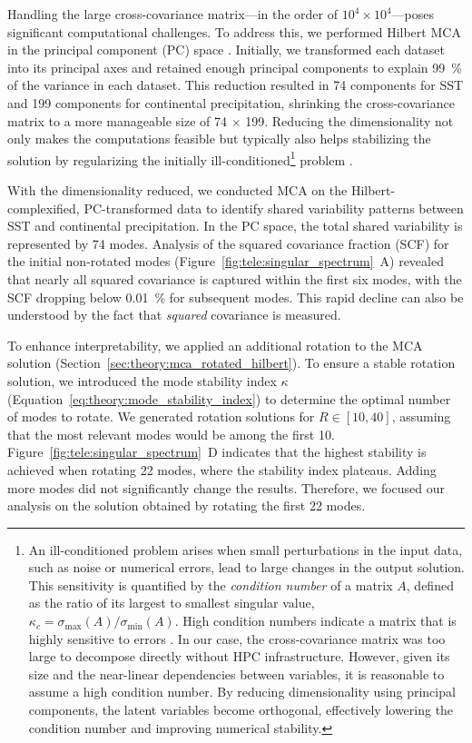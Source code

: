 Handling the large cross-covariance matrix---in the order of $10^4 \times 10^4$---poses significant computational challenges. To address this, we performed Hilbert MCA in the principal component (PC) space \cite{barnett_origins_1987}. Initially, we transformed each dataset into its principal axes and retained enough principal components to explain \qty{99}{\percent} of the variance in each dataset. This reduction resulted in 74 components for SST and 199 components for continental precipitation, shrinking the cross-covariance matrix to a more manageable size of 74 $\times$ 199. Reducing the dimensionality not only makes the computations feasible but typically also helps stabilizing the solution by regularizing the initially ill-conditioned\footnote{An ill-conditioned problem arises when small perturbations in the input data, such as noise or numerical errors, lead to large changes in the output solution. This sensitivity is quantified by the \textit{condition number} of a matrix $A$, defined as the ratio of its largest to smallest singular value, $\kappa_c = \sigma_{\text{max}}(A) / \sigma_{\text{min}}(A)$. High condition numbers indicate a matrix that is highly sensitive to errors \cite[e.g.][Section 2.6]{golub_matrix_2013}. In our case, the cross-covariance matrix was too large to decompose directly without HPC infrastructure. However, given its size and the near-linear dependencies between variables, it is reasonable to assume a high condition number. By reducing dimensionality using principal components, the latent variables become orthogonal, effectively lowering the condition number and improving numerical stability.} problem \cite{barnett_origins_1987}.

With the dimensionality reduced, we conducted MCA on the Hilbert-complexified, PC-transformed data to identify shared variability patterns between SST and continental precipitation. In the PC space, the total shared variability is represented by 74 modes. Analysis of the squared covariance fraction (SCF) for the initial non-rotated modes (Figure~\ref{fig:tele:singular_spectrum}~A) revealed that nearly all squared covariance is captured within the first six modes, with the SCF dropping below \qty{0.01}{\percent} for subsequent modes. This rapid decline can also be understood by the fact that \emph{squared} covariance is measured. 

To enhance interpretability, we applied an additional rotation to the MCA solution (Section~\ref{sec:theory:mca_rotated_hilbert}). To ensure a stable rotation solution, we introduced the mode stability index $\kappa$ (Equation~\eqref{eq:theory:mode_stability_index}) to determine the optimal number of modes to rotate. We generated rotation solutions for $R\in[10, 40]$, assuming that the most relevant modes would be among the first 10. Figure~\ref{fig:tele:singular_spectrum}~D indicates that the highest stability is achieved when rotating 22 modes, where the stability index plateaus. Adding more modes did not significantly change the results. Therefore, we focused our analysis on the solution obtained by rotating the first 22 modes.

